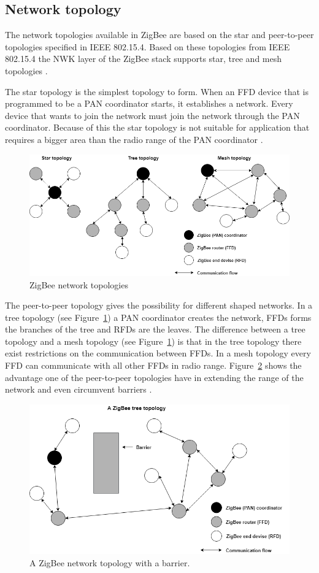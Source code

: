 \subsection{Network topology}
The network topologies available in ZigBee are based on the star and peer-to-peer topologies specified in IEEE 802.15.4. Based on these topologies from IEEE 802.15.4 the NWK layer of the ZigBee stack supports star, tree and mesh topologies \citep{farahani2011zigbee}.

The star topology is the simplest topology to form. When an FFD device that is programmed to be a PAN coordinator starts, it establishes a network. Every device that wants to join the network must join the network through the PAN coordinator. Because of this the star topology is not suitable for application that requires a bigger area than the radio range of the PAN coordinator \citep{yang2014internet}.

\begin{figure}[H]
\centering
\includegraphics[scale=0.5]{figure/zigbeetopologies.png}
\caption{ZigBee network topologies}
\label{fig:zigbeetopologies}
\end{figure}

The peer-to-peer topology gives the possibility for different shaped networks. In a tree topology (see Figure~\ref{fig:zigbeetopologies}) a PAN coordinator creates the network, FFDs forms the branches of the tree and RFDs are the leaves. The difference between a tree topology and a mesh topology (see Figure~\ref{fig:zigbeetopologies}) is that in the tree topology there exist restrictions on the communication between FFDs. In a mesh topology every FFD can communicate with all other FFDs in radio range. Figure~\ref{fig:barrier_topology} shows the advantage one of the peer-to-peer topologies have in extending the range of the network and even circumvent barriers \citep{farahani2011zigbee}.

\begin{figure}[ht]
\centering
\includegraphics[scale=0.5]{figure/barrier_topology.png}
\caption{A ZigBee network topology with a barrier.}
\label{fig:barrier_topology}
\end{figure}
